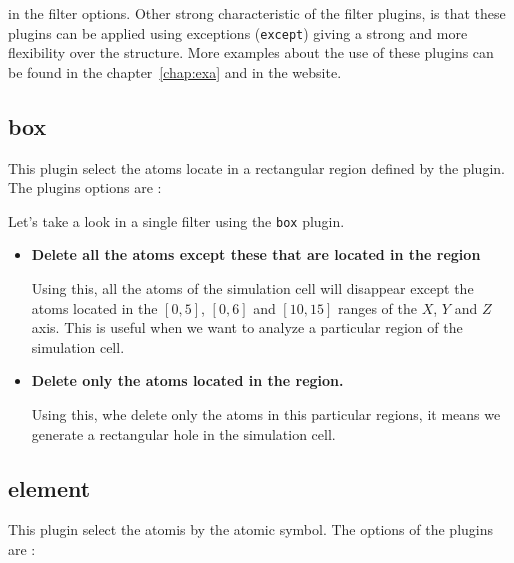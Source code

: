 
\noindent
in the filter options. Other strong characteristic of the filter plugins, is
that these plugins can be applied using exceptions (\verb|except|) giving a
strong and more flexibility over the structure. More examples about the use of
these plugins can be found in the chapter~\ref{chap:exa} and in the website.

\subsection{box}
This plugin select the atoms locate in a rectangular region defined by the
plugin. The plugins options are :


Let's take a look in a single filter using the \verb|box| plugin.

\begin{itemize}
 \item \textbf{Delete all the atoms except these that are located in the region}

Using this, all the atoms of the simulation cell will disappear except the
atoms located in the $[0,5]$, $[0,6]$ and $[10,15]$ ranges of the $X$, $Y$ and
$Z$ axis. This is useful when we want to analyze a particular region of the
simulation cell.
 
 \item \textbf{Delete only the atoms located in the region.}

Using this, whe delete only the atoms in this particular regions, it means we
generate a rectangular hole in the simulation cell.
\end{itemize}

\subsection{element}
This plugin select the atomis by the atomic symbol. The options of the plugins
are :


